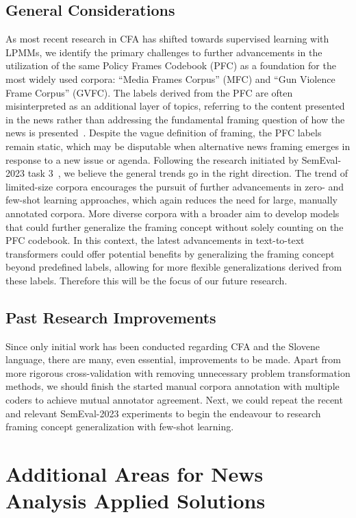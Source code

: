 \subsection{General Considerations}

As most recent research in CFA has shifted towards supervised learning with LPMMs, we identify the primary challenges to further advancements in the utilization of the same Policy Frames Codebook (PFC) as a foundation for the most widely used corpora: ``Media Frames Corpus'' (MFC) and ``Gun Violence Frame Corpus'' (GVFC).
The labels derived from the PFC are often misinterpreted as an additional layer of topics, referring to the content presented in the news rather than addressing the fundamental framing question of how the news is presented~\parencite{ali-hassan-2022-survey}.
Despite the vague definition of framing, the PFC labels remain static, which may be disputable when alternative news framing emerges in response to a new issue or agenda.
Following the research initiated by SemEval-2023 task 3~\parencite{piskorski-etal-2023-semeval-task3}, we believe the general trends go in the right direction. 
The trend of limited-size corpora encourages the pursuit of further advancements in zero- and few-shot learning approaches, which again reduces the need for large, manually annotated corpora.
More diverse corpora with a broader aim to develop models that could further generalize the framing concept without solely counting on the PFC codebook.
In this context, the latest advancements in text-to-text transformers could offer potential benefits by generalizing the framing concept beyond predefined labels, allowing for more flexible generalizations derived from these labels. 
Therefore this will be the focus of our future research.

\subsection{Past Research Improvements}
Since only initial work has been conducted regarding CFA and the Slovene language, there are many, even essential, improvements to be made.
Apart from more rigorous cross-validation with removing unnecessary problem transformation methods, we should finish the started manual corpora annotation with multiple coders to achieve mutual annotator agreement.
Next, we could repeat the recent and relevant SemEval-2023 experiments to begin the endeavour to research framing concept generalization with few-shot learning.

\section{Additional Areas for News Analysis Applied Solutions}

